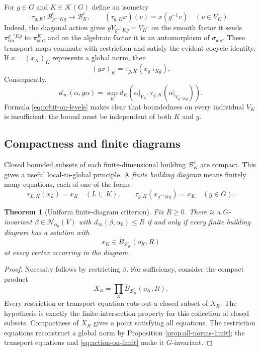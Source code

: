 \documentclass[12pt]{article}
\newtheorem{theorem}{Theorem}[section]
\theoremstyle{definition}
\theoremstyle{remark}
\newcommand{\Norm}{\mathscr N}
\newcommand{\dinf}{d_{\infty}}
\newcommand{\Building}{\mathcal B}
\begin{document}
For $g\in G$ and $K\in\mathcal K(G)$ define an isometry
\[
 \tau_{g,K}:
 \Building_{g^{-1}Kg}^{\mathrm e}\longrightarrow
 \Building_K^{\mathrm e},\qquad
 (\tau_{g,K}x)(v)=x(g^{-1}v)\quad(v\in V_K).
\]
Indeed, the diagonal action gives
$gV_{g^{-1}Kg}=V_K$: on the smooth factor it sends
$\pi_{\mathrm{sm}}^{g^{-1}Kg}$ to $\pi_{\mathrm{sm}}^K$, and on the
algebraic factor it is an automorphism of
$\sigma_{\mathrm{alg}}$.
These transport maps commute with restriction and satisfy the evident
cocycle identity.  If $x=(x_K)_K$ represents a global norm, then
\begin{equation}\label{eq:action-on-limit}
  (gx)_K=\tau_{g,K}(x_{g^{-1}Kg}).
\end{equation}
Consequently,
\begin{equation}\label{eq:orbit-on-levels}
 \dinf(\alpha,g\alpha)
 =\sup_Kd_K\!\left(
   \alpha|_{V_K},
   \tau_{g,K}(\alpha|_{V_{g^{-1}Kg}})
 \right).
\end{equation}
Formula \eqref{eq:orbit-on-levels} makes clear that boundedness on every
individual $V_K$ is insufficient: the bound must be independent of
both $K$ and $g$.

\subsection{Compactness and finite diagrams}

Closed bounded subsets of each finite-dimensional building
$\Building_K^{\mathrm e}$ are compact.  This gives a useful
local-to-global principle.  A \emph{finite building diagram} means
finitely many equations, each of one of the forms
\[
 r_{L,K}(x_L)=x_K\quad(L\subseteq K),\qquad
 \tau_{g,K}(x_{g^{-1}Kg})=x_K\quad(g\in G).
\]

\begin{theorem}[Uniform finite-diagram criterion]
\label{thm:finite-diagrams}
Fix $R\geq0$.  There is a $G$-invariant
$\beta\in\Norm_{\alpha_0}(V)$ with
$\dinf(\beta,\alpha_0)\leq R$ if and only if every finite building
diagram has a solution with
\[
  x_K\in\overline B_{\Building_K^{\mathrm e}}(o_K,R)
\]
at every vertex occurring in the diagram.
\end{theorem}

\begin{proof}
Necessity follows by restricting $\beta$.  For sufficiency, consider
the compact product
\[
  X_R=\prod_K\overline B_{\Building_K^{\mathrm e}}(o_K,R).
\]
Every restriction or transport equation cuts out a closed subset of
$X_R$.  The hypothesis is exactly the finite-intersection property for
this collection of closed subsets.  Compactness of $X_R$ gives a point
satisfying all equations.  The restriction equations reconstruct a
global norm by Proposition \ref{prop:all-norms-limit}; the transport
equations and \eqref{eq:action-on-limit} make it $G$-invariant.
\end{proof}
\end{document}
